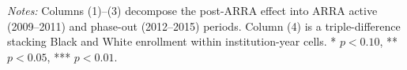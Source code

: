 \begin{table}[htbp]
   \par\vspace{0.3em}\begin{minipage}{\textwidth}\small 
   \textit{Notes:} Columns (1)--(3) decompose the post-ARRA effect into ARRA active (2009--2011) and phase-out (2012--2015) periods. Column (4) is a triple-difference stacking Black and White enrollment within institution-year cells. * $p<0.10$, ** $p<0.05$, *** $p<0.01$.
\end{minipage}
\end{table}



